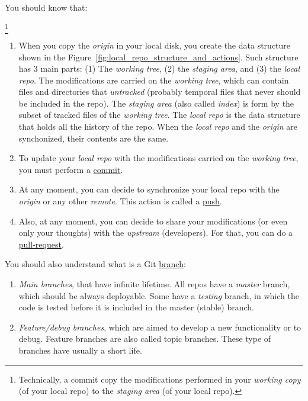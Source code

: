 You should know that:

\footnote{Technically, a commit copy the modifications
performed in your \emph{working copy} (of your local repo) to the
\emph{staging area} (of your local repo).}

\begin{enumerate}

\item When you copy the \emph{origin} in your local disk, you create
  the data structure shown in the
  Figure~\ref{fig:local_repo_structure_and_actions}. Such structure
  has 3 main parts: (1) The \emph{working tree}, (2) the \emph{staging
  area}, and (3) the \emph{local repo}. The modifications are carried
  on the \emph{working tree}, which can contain files and directories
  that \emph{untracked} (probably temporal files that never should be
  included in the repo). The \emph{staging area} (also called
  \emph{index}) is form by the subset of tracked files of the
  \emph{working tree}. The \emph{local repo} is the data structure
  that holds all the history of the repo. When the \emph{local repo}
  and the \emph{origin} are synchonized, their contents are the same.

\item To update your \emph{local repo} with the modifications carried
  on the \emph{working tree}, you must perform a
  \href{https://docs.github.com/en/github/getting-started-with-github/github-glossary#commit}{commit}.
  
\item At any moment, you can decide to synchronize your local repo
  with the \emph{origin} or any other \emph{remote}. This action is
  called a
  \href{https://docs.github.com/en/github/using-git/pushing-commits-to-a-remote-repository}{push}.
\item Also, at any moment, you can decide to share your modifications
  (or even only your thoughts) with the \emph{upstream}
  (developers). For that, you can do a
  \href{https://docs.github.com/en/github/collaborating-with-issues-and-pull-requests/about-pull-requests}{pull-request}.
\end{enumerate}

You should also understand what is a
Git \href{https://docs.gitlab.com/ee/topics/gitlab_flow.html}{branch}:
\begin{enumerate}
\item \emph{Main branches}, that have infinite lifetime. All repos
  have a \emph{master} branch, which should be always deployable. Some
  have a \emph{testing} branch, in which the code is tested before it
  is included in the master (stable) branch.
\item \emph{Feature/debug branches}, which are aimed to develop a new
  functionality or to debug. Feature branches are also called topic
  branches. These type of branches have usually a short life.
\end{enumerate}

